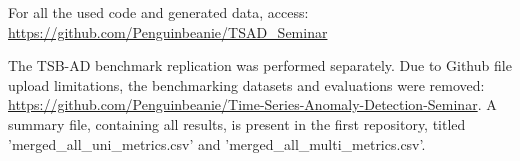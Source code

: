 \documentclass[12pt,oneside]{article}
\begin{document}
For all the used code and generated data, access: \url{https://github.com/Penguinbeanie/TSAD_Seminar}

The TSB-AD benchmark replication was performed separately. Due to Github file upload limitations, the benchmarking datasets and evaluations were removed: \url{https://github.com/Penguinbeanie/Time-Series-Anomaly-Detection-Seminar}. A summary file, containing all results, is present in the first repository, titled 'merged\_all\_uni\_metrics.csv' and 'merged\_all\_multi\_metrics.csv'.


\end{document}
